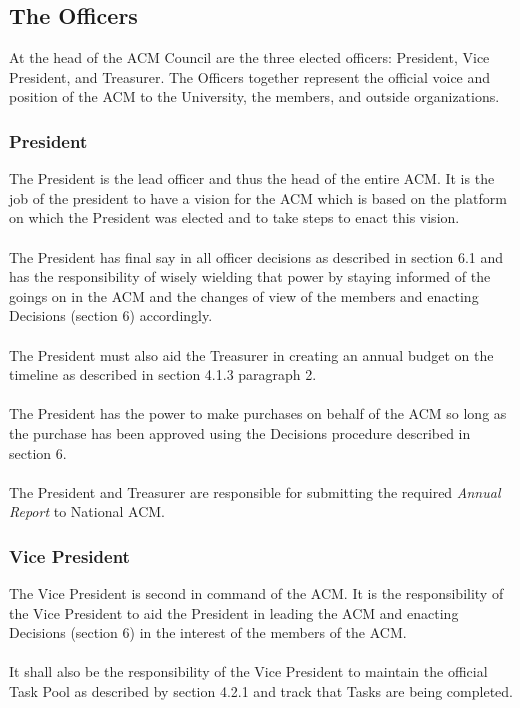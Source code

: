 \documentclass[12pt,titlepage]{article}
\begin{document}
\subsection{The Officers}

At the head of the ACM Council are the three elected officers: President, Vice President, and Treasurer. The Officers together represent the official voice and position of the ACM to the University, the members, and outside organizations.

\subsubsection{President}

The President is the lead officer and thus the head of the entire ACM. It is the job of the president to have a vision for the ACM which is based on the platform on which the President was elected and to take steps to enact this vision.\\
\\
The President has final say in all officer decisions as described in section 6.1 and has the responsibility of wisely wielding that power by staying informed of the goings on in the ACM and the changes of view of the members and enacting Decisions (section 6) accordingly.\\
\\
The President must also aid the Treasurer in creating an annual budget on the timeline as described in section 4.1.3 paragraph 2.\\
\\
The President has the power to make purchases on behalf of the ACM so long as the purchase has been approved using the Decisions procedure described in section 6.\\
\\
The President and Treasurer are responsible for submitting the required \emph{Annual Report} to National ACM.

\subsubsection{Vice President}

The Vice President is second in command of the ACM. It is the responsibility of the Vice President to aid the President in leading the ACM and enacting Decisions (section 6) in the interest of the members of the ACM.\\
\\
It shall also be the responsibility of the Vice President to maintain the official Task Pool as described by section 4.2.1 and track that Tasks are being completed.
\end{document}
